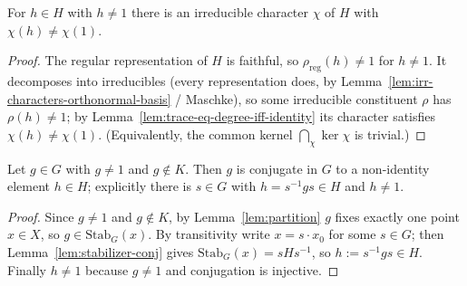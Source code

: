 \begin{lemma}
    \label{lem:irr-separates}
    For $h \in H$ with $h \neq 1$ there is an irreducible character $\chi$ of $H$
    with $\chi(h) \neq \chi(1)$.
\end{lemma}
\begin{proof}
    The regular representation of $H$ is faithful, so $\rho_{\mathrm{reg}}(h) \neq
    1$ for $h \neq 1$. It decomposes into irreducibles (every representation does,
    by Lemma~\ref{lem:irr-characters-orthonormal-basis} / Maschke), so some
    irreducible constituent $\rho$ has $\rho(h) \neq 1$; by
    Lemma~\ref{lem:trace-eq-degree-iff-identity} its character satisfies $\chi(h)
    \neq \chi(1)$. (Equivalently, the common kernel $\bigcap_\chi \ker\chi$ is
    trivial.)
\end{proof}

\begin{lemma}
    \label{lem:non-kernel-conjugate-to-H}
    \leanok
    Let $g \in G$ with $g \neq 1$ and $g \notin K$. Then $g$ is conjugate in $G$
    to a non-identity element $h \in H$; explicitly there is $s \in G$ with $h =
    s^{-1} g s \in H$ and $h \neq 1$.
\end{lemma}
\begin{proof}
    Since $g \neq 1$ and $g \notin K$, by Lemma~\ref{lem:partition} $g$ fixes
    exactly one point $x \in X$, so $g \in \mathrm{Stab}_G(x)$. By transitivity
    write $x = s \cdot x_0$ for some $s \in G$; then
    Lemma~\ref{lem:stabilizer-conj} gives $\mathrm{Stab}_G(x) = s H s^{-1}$, so
    $h := s^{-1} g s \in H$. Finally $h \neq 1$ because $g \neq 1$ and conjugation
    is injective.
\end{proof}


